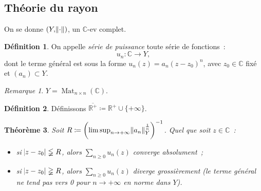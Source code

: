\documentclass{report}
\newtheorem{thm}{Théorème}[chapter]
\theoremstyle{definition}
\newtheorem{déf}[thm]{Définition}
\theoremstyle{remark}
\newtheorem*{rmq}{Remarque}
\numberwithin{equation}{section}
\newcommand{\C}{\mathbb C}
\newcommand{\R}{\mathbb R}
\newcommand{\Rp}{\R^{+}}
\DeclareMathOperator{\Mat}{Mat}
\newcommand{\pinfty}{{+\infty}}
\begin{document}
		\subsection{Théorie du rayon}
			On se donne $(Y, \norm \cdot)$, un $\C$-ev complet.

			\begin{déf} On appelle \textit{série de puissance} toute série de fonctions~:
			\begin{equation}
				u_n : \C \to Y,
			\end{equation}
			dont le terme général est sous la forme $u_n(z) = a_n(z-z_0)^n$, avec $z_0 \in \C$ fixé et $(a_n) \subset Y$.
			\end{déf}

			\begin{rmq} $Y = \Mat_{n \times n}(\C)$.
			\end{rmq}

			\begin{déf} Définissons $\overline {\Rp} \coloneqq \Rp \cup \{\pinfty\}$.
			\end{déf}

			\begin{thm}\label{thm:rayondeconvergence} Soit $R \coloneqq \left(\limsup_{n \to \pinfty}\norm {a_n}_Y^{\frac 1n}\right)^{-1}$. Quel que soit
			$z \in \C$~:
			\begin{itemize}
				\item si $\abs {z - z_0} \lneqq R$, alors $\sum_{n \geq 0}u_n(z)$ converge absolument~;
				\item si $\abs {z - z_0} \gneqq R$, alors $\sum_{n \geq 0}u_n(z)$ diverge grossièrement (le terme général ne tend pas vers 0 pour $n \to \pinfty$
				en norme dans $Y$).
			\end{itemize}
			\end{thm}
\end{document}
